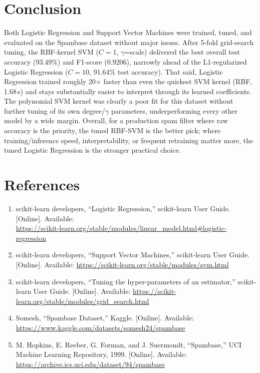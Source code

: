 \documentclass[12pt,a4paper]{article}
\begin{document}
\section{Conclusion}
Both Logistic Regression and Support Vector Machines were trained, tuned, and
evaluated on the Spambase dataset without major issues. After 5-fold grid-search
tuning, the RBF-kernel SVM ($C=1$, $\gamma$=scale) delivered the best overall test
accuracy (93.49\%) and F1-score (0.9206), narrowly ahead of the L1-regularized
Logistic Regression ($C=10$, 91.64\% test accuracy). That said, Logistic Regression
trained roughly 20$\times$ faster than even the quickest SVM kernel (RBF, 1.68\,s) and
stays substantially easier to interpret through its learned coefficients. The
polynomial SVM kernel was clearly a poor fit for this dataset without further tuning
of its own degree/$\gamma$ parameters, underperforming every other model by a wide
margin. Overall, for a production spam filter where raw accuracy is the priority, the
tuned RBF-SVM is the better pick; where training/inference speed, interpretability, or
frequent retraining matter more, the tuned Logistic Regression is the stronger
practical choice.
 
\section{References}
\begin{enumerate}
\item scikit-learn developers, ``Logistic Regression,'' scikit-learn User Guide.
[Online]. Available: \\ \url{https://scikit-learn.org/stable/modules/linear_model.html#logistic-regression}
\item scikit-learn developers, ``Support Vector Machines,'' scikit-learn User Guide.
[Online]. Available: \url{https://scikit-learn.org/stable/modules/svm.html}
\item scikit-learn developers, ``Tuning the hyper-parameters of an estimator,''
scikit-learn User Guide. [Online]. Available: \url{https://scikit-learn.org/stable/modules/grid_search.html}
\item Somesh, ``Spambase Dataset,'' Kaggle. [Online]. Available:
\url{https://www.kaggle.com/datasets/somesh24/spambase}
\item M. Hopkins, E. Reeber, G. Forman, and J. Suermondt, ``Spambase,'' UCI Machine
Learning Repository, 1999. [Online]. Available: \url{https://archive.ics.uci.edu/dataset/94/spambase}
\end{enumerate}
 
\end{document}
